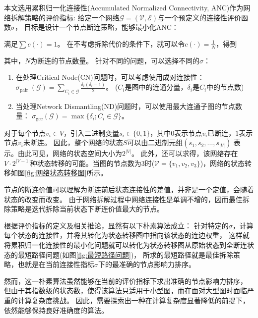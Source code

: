 \documentclass[twocolumn]{morningstar}
\begin{document}
本文选用累积归一化连接性(Accumulated Normalized Connectivity, ANC)作为网络拆解策略的评价指标\cite{schneider2011ANC}: 
给定一个网络$\mathcal{G}=(\mathcal{V},\mathcal{E})$与一个预定义的连接性评价函数$\sigma$，
目标是设计一个节点断连策略，能够最小化ANC：


\noindent 满足$\sum c(\cdot) = 1$。
在不考虑拆除代价的条件下，就可以令$c(\cdot) = \frac{1}{N}$，得到


\noindent 其中，$N$为断连的节点数量。
针对不同的问题，可以选择不同的$\sigma$：

\begin{enumerate}[leftmargin=1em]
    \item 在处理Critical Node(CN)问题\cite{arulselvan2009恐怖分子网络_CN}时，可以考虑使用成对连接性：
    $\sigma_{\text {pair }}(\mathcal{G})=\sum_{C_i \in \mathcal{G}} \frac{\delta_i(\delta_i-1)}{2}$。
    ($C_i$是图中的连通分量，$\delta_i$是$C_i$中的节点数)
    \item 当处理Network Dismantling(ND)问题\cite{braunstein2016ND}时，可以使用最大连通子图的节点数量：
    $\sigma_{\mathrm{gcc}}(\mathcal{G})=\max \{\delta_i ; C_i \in \mathcal{G}\}$。
\end{enumerate}

对于每个节点$v_i \in V$，引入二进制变量$s_i \in \{0,1\}$，其中$0$表示节点$v_i$已断连，$1$表示节点$v_i$未断连。
因此，整个网络的状态$S$可以由二进制元组$(s_1, s_2, \ldots, s_{|V|})$ 表示。由此可见，网络的状态空间大小为$2^{|V|}$。
此外，还可以求得，该网络存在$V\cdot2^{|V-1|}$种状态转移的可能。当图的节点数为3时($\mathcal{V} = \{v_1, v_2, v_3\}$)，网络的状态转移如图\ref{fig:网络状态转移图}所示。



节点的断连价值可以理解为断连前后状态连接性的差值，并非是一个定值，会随着状态的改变而改变。
由于网络拆解过程中网络连接性是单调不增的，因而最佳拆除策略是迭代拆除当前状态下断连价值最大的节点。



根据评价指标的定义及相关推论，显然有以下朴素算法成立：
针对特定的$\sigma$，计算每个状态的连接性，并将其转化为状态转移图中指向该状态的连边权重，
这样就将累积归一化连接性的最小化问题就可以转化为状态转移图从原始状态到全断连状态的最短路径问题(如图\ref{fig:最短路径问题})，
所求的最短路径就是最佳拆除策略，也就是在当前连接性指标$\sigma$下的最准确的节点影响力排序。


然而，这一朴素算法虽然能够在当前的评价指标下求出准确的节点影响力排序，
但由于其指数级的状态数，使得该算法只适用于小型图，而在面对大型图时面临严重的计算复杂度挑战。
因此，需要探索出一种在计算复杂度显著降低的前提下，依然能够保持良好准确度的算法。
\end{document}
